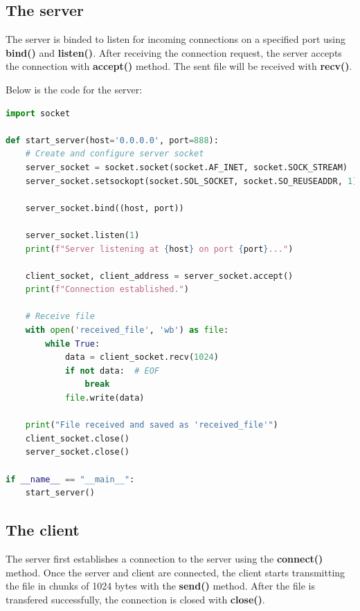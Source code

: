 \documentclass[12pt]{article}
\begin{document}
\subsection{The server}
The server is binded to listen for incoming connections on a specified port using \textbf{bind()}  and \textbf{listen()}. After receiving the connection request, the server accepts the connection with \textbf{accept()} method. The sent file will be received with \textbf{recv()}.

Below is the code for the server:
\newpage
\begin{lstlisting}[language=Python]
import socket

def start_server(host='0.0.0.0', port=888):
    # Create and configure server socket
    server_socket = socket.socket(socket.AF_INET, socket.SOCK_STREAM)
    server_socket.setsockopt(socket.SOL_SOCKET, socket.SO_REUSEADDR, 1)

    server_socket.bind((host, port))

    server_socket.listen(1)
    print(f"Server listening at {host} on port {port}...")

    client_socket, client_address = server_socket.accept()
    print(f"Connection established.")

    # Receive file
    with open('received_file', 'wb') as file:
        while True:
            data = client_socket.recv(1024) 
            if not data:  # EOF
                break
            file.write(data)

    print("File received and saved as 'received_file'")
    client_socket.close()
    server_socket.close()

if __name__ == "__main__":
    start_server()
\end{lstlisting}

\subsection{The client}
The server first establishes a connection to the server using the \textbf{connect()} method. Once the server and client are connected, the client starts transmitting the file in chunks of 1024 bytes with the \textbf{send()} method. After the file is transfered successfully, the connection is closed with \textbf{close()}.
\end{document}
